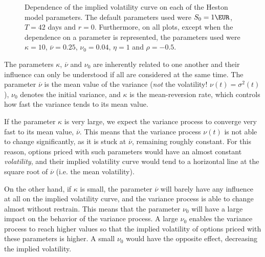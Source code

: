 \vspace{\fill}
\newpage

\begin{figure}[H]
  \begin{subfigmatrix}{2}
  \end{subfigmatrix}
  \caption[Dependence of the implied volatility curve on each of the Heston model parameters.]{Dependence of the implied volatility curve on each of the Heston model parameters. The default parameters used were $S_0=1\EUR$, $T=42$ days and $r=0$. Furthermore, on all plots, except when the dependence on a parameter is represented, the parameters used were $\kappa=10$, $\overline{\nu}=0.25$, $\nu_0=0.04$, $\eta=1$ and $\rho=-0.5$.}
  \label{fig:Hparam}
\end{figure}

The parameters $\kappa$, $\overline{\nu}$ and $\nu_0$ are inherently related to one another and their influence can only be understood if all are considered at the same time. The parameter $\overline{\nu}$ is the mean value of the variance (\emph{not} the volatility! $\nu(t)=\sigma^2(t)$), $\nu_0$ denotes the initial variance, and $\kappa$ is the mean-reversion rate, which controls how fast the variance tends to its mean value.

If the parameter $\kappa$ is very large, we expect the variance process to converge very fast to its mean value, $\overline{\nu}$. This means that the variance process $\nu(t)$ is not able to change significantly, as it is stuck at $\overline{\nu}$, remaining roughly constant. For this reason, options priced with such parameters would have an almost constant \emph{volatility}, and their implied volatility curve would tend to a horizontal line at the square root of $\overline{\nu}$ (i.e. the mean volatility).

On the other hand, if $\kappa$ is small, the parameter $\overline{\nu}$ will barely have any influence at all on the implied volatility curve, and the variance process is able to change almost without restrain. This means that the parameter $\nu_0$ will have a large impact on the behavior of the variance process. A large $\nu_0$ enables the variance process to reach higher values so that the implied volatility of options priced with these parameters is higher. A small $\nu_0$ would have the opposite effect, decreasing the implied volatility.

